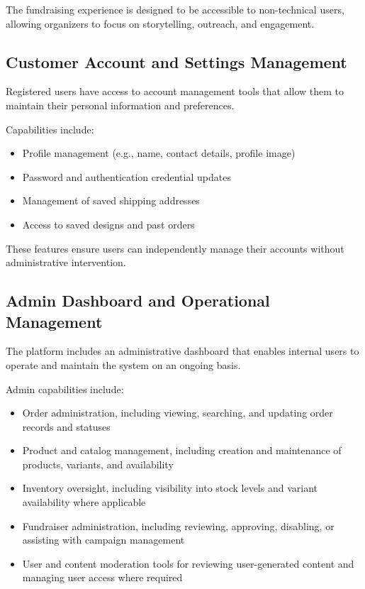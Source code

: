 The fundraising experience is designed to be accessible to non-technical users,
allowing organizers to focus on storytelling, outreach, and engagement.

\subsection{Customer Account and Settings Management}

Registered users have access to account management tools that allow them to
maintain their personal information and preferences.

Capabilities include:
\begin{itemize}[leftmargin=1.5em]
    \item Profile management (e.g., name, contact details, profile image)
    \item Password and authentication credential updates
    \item Management of saved shipping addresses
    \item Access to saved designs and past orders
\end{itemize}

These features ensure users can independently manage their accounts without
administrative intervention.

\subsection{Admin Dashboard and Operational Management}

The platform includes an administrative dashboard that enables internal users
to operate and maintain the system on an ongoing basis.

Admin capabilities include:
\begin{itemize}[leftmargin=1.5em]
    \item Order administration, including viewing, searching, and updating order
    records and statuses
    \item Product and catalog management, including creation and maintenance
    of products, variants, and availability
    \item Inventory oversight, including visibility into stock levels and variant
    availability where applicable
    \item Fundraiser administration, including reviewing, approving, disabling,
    or assisting with campaign management
    \item User and content moderation tools for reviewing user-generated content
    and managing user access where required
\end{itemize}

